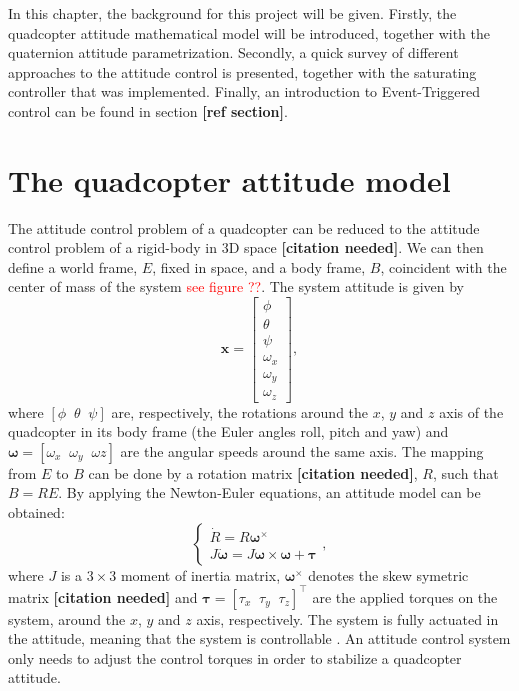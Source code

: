 In this chapter, the background for this project will be given. Firstly, the quadcopter attitude mathematical model will be introduced, together with the quaternion attitude parametrization. Secondly, a quick survey of different approaches to the attitude control is presented, together with the saturating controller that was implemented. Finally, an introduction to Event-Triggered control can be found in section \textbf{[ref section]}.

\section{The quadcopter attitude model}
	
	The attitude control problem of a quadcopter can be reduced to the attitude control problem of a rigid-body in $3$D space \textbf{[citation needed]}. We can then define a world frame, $E$, fixed in space, and a body frame, $B$, coincident with the center of mass of the system \textcolor{red}{see figure ??}. The system attitude is given by
	\[
		\mathbf{x} = \begin{bmatrix}
				\phi\\
				\theta\\
				\psi\\
				\omega_{x}\\
				\omega_{y}\\
				\omega_{z}
			     \end{bmatrix},
	\]
	where $\left [\phi\;\;\theta\;\;\psi \right]$ are, respectively, the rotations around the $x$, $y$ and $z$ axis of the quadcopter in its body frame (the Euler angles roll, pitch and yaw) and $\boldsymbol \omega = \left [\omega_{x}\;\;\omega_{y}\;\;\omega{z} \right]$ are the angular speeds around the same axis. The mapping from $E$ to $B$ can be done by a rotation matrix \textbf{[citation needed]}, $R$, such that $B = R E$. By applying the Newton-Euler equations, an attitude model can be obtained:
	\begin{equation}
		\left \{ \begin{array}{l}
				\dot R = R \boldsymbol \omega^\times\\
				J \boldsymbol{ \dot \omega }= J \boldsymbol \omega \times \boldsymbol \omega + \boldsymbol \tau
			\end{array} \right . ,
		\label{attitude_dynamics_eq}
	\end{equation}
	where $J$ is a $3\times3$ moment of inertia matrix, $\boldsymbol \omega^\times$ denotes the skew symetric matrix \textbf{[citation needed]} and $\boldsymbol \tau = \left [\tau_x\;\;\tau_y\;\;\tau_z\right]^\top$ are the applied torques on the system, around the $x$, $y$ and $z$ axis, respectively. The system is fully actuated in the attitude, meaning that the system is controllable \cite{rigid_attitude_control}. An attitude control system only needs to adjust the control torques in order to stabilize a quadcopter attitude.
	
